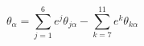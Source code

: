 \begin{equation}
\theta_{\alpha}=\sum^6_{j=1}e^j\theta_{j\alpha} -
\sum^{11}_{k=7}e^k\theta_{k\alpha}
\end{equation}

